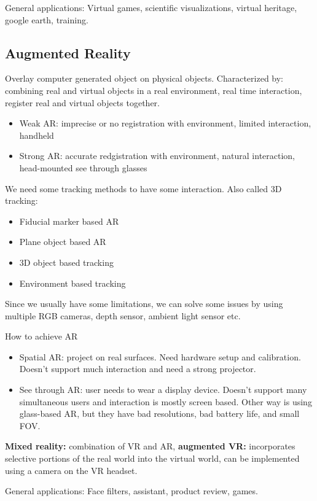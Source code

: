 \documentclass[a4paper]{article}
\begin{document}
General applications:
Virtual games, scientific visualizations, virtual heritage, google earth, training.


\subsection*{Augmented Reality}
Overlay computer generated object on physical objects. Characterized by: combining real and virtual objects in a real environment, real time interaction, register real and virtual objects together.

\begin{itemize}
    \item Weak AR: imprecise or no registration with environment, limited interaction, handheld
    \item Strong AR: accurate redgistration with environment, natural interaction, head-mounted see through glasses
\end{itemize}

We need some tracking methods to have some interaction. Also called 3D tracking:

\begin{itemize}
    \item Fiducial marker based AR
    \item Plane object based AR
    \item 3D object based tracking
    \item Environment based tracking
\end{itemize}

Since we usually have some limitations, we can solve some issues by using multiple RGB cameras, depth sensor, ambient light sensor etc.

How to achieve AR
\begin{itemize}
    \item Spatial AR: project on real surfaces. Need hardware setup and calibration. Doesn't support much interaction and need a strong projector.
    \item See through AR: user needs to wear a display device. Doesn't support many simultaneous users and interaction is mostly screen based. Other way is using glass-based AR, but they have bad resolutions, bad battery life, and small FOV.
\end{itemize}

\textbf{Mixed reality:} combination of VR and AR, \textbf{augmented VR:} incorporates selective portions of the real world into the virtual world, can be implemented using a camera on the VR headset.

General applications:
Face filters, assistant, product review, games.
\end{document}
